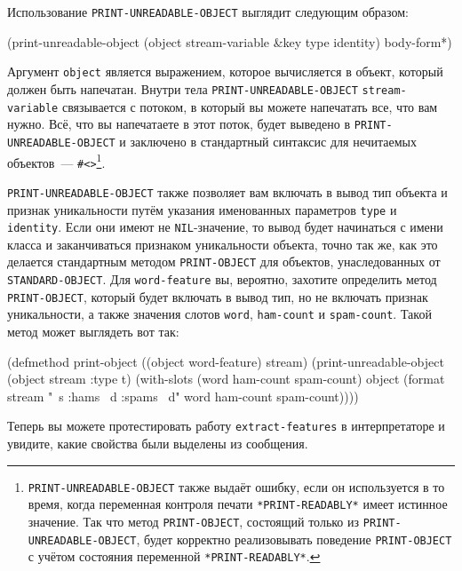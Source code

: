 Использование \lstinline{PRINT-UNREADABLE-OBJECT} выглядит следующим образом:

\begin{myverb}
(print-unreadable-object (object stream-variable &key type identity)
  body-form*)
\end{myverb}

Аргумент \lstinline{object} является выражением, которое вычисляется в объект, который должен
быть напечатан.  Внутри тела \lstinline{PRINT-UNREADABLE-OBJECT} \lstinline{stream-variable}
связывается с потоком, в который вы можете напечатать все, что вам нужно. Всё, что вы
на\-пе\-ча\-тае\-те в этот поток, будет выведено в \lstinline{PRINT-UNREADABLE-OBJECT} и заключено в
стандартный синтаксис для нечитаемых объектов~---
\lstinline!#<>!\footnote{\lstinline{PRINT-UNREADABLE-OBJECT} также выдаёт ошибку, если он
  используется в то время, когда переменная контроля печати \lstinline{*PRINT-READABLY*} имеет
  истинное значение.  Так что метод \lstinline{PRINT-OBJECT}, состоящий только из
  \lstinline{PRINT-UNREADABLE-OBJECT}, будет корректно реализовывать поведение
  \lstinline{PRINT-OBJECT} с учётом состояния переменной \lstinline{*PRINT-READABLY*}.}\hspace{\footnotenegspace}.

\lstinline{PRINT-UNREADABLE-OBJECT} также позволяет вам включать в вывод тип объекта и признак
уникальности путём указания именованных параметров \lstinline{type} и
\lstinline{identity}.  Если они имеют не \lstinline{NIL}-значение, то вывод будет начинаться с имени
класса и заканчиваться признаком уникальности объекта, точно так же, как
это делается стандартным методом \lstinline{PRINT-OBJECT} для объектов, унаследованных от
\lstinline{STANDARD-OBJECT}.  Для \lstinline{word-feature} вы, вероятно, захотите определить метод
\lstinline{PRINT-OBJECT}, который будет включать в вывод тип, но не включать признак
уникальности, а также значения слотов \lstinline{word}, \lstinline{ham-count} и
\lstinline{spam-count}.  Такой метод может выглядеть вот так:

\begin{myverb}
(defmethod print-object ((object word-feature) stream)
  (print-unreadable-object (object stream :type t)
    (with-slots (word ham-count spam-count) object
      (format stream "~s :hams ~d :spams ~d" word ham-count spam-count))))
\end{myverb}

Теперь вы можете протестировать работу \lstinline{extract-features} в интерпретаторе и увидите,
какие свойства были выделены из сообщения.

